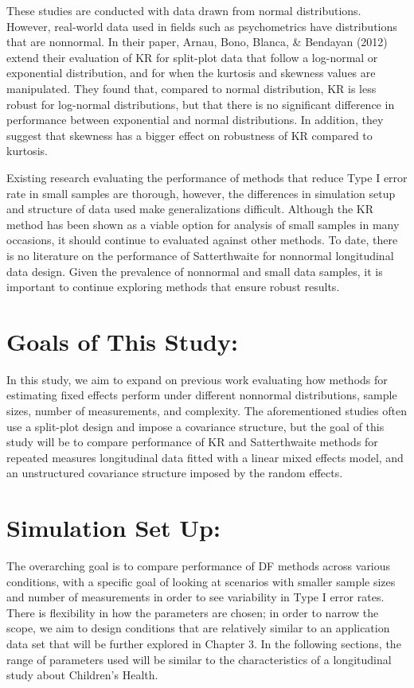 \documentclass[12pt, twoside]{amherstthesis}
\begin{document}
These studies are conducted with data drawn from normal distributions. However, real-world data used in fields such as psychometrics have distributions that are nonnormal. In their paper, Arnau, Bono, Blanca, \& Bendayan (2012) extend their evaluation of KR for split-plot data that follow a log-normal or exponential distribution, and for when the kurtosis and skewness values are manipulated. They found that, compared to normal distribution, KR is less robust for log-normal distributions, but that there is no significant difference in performance between exponential and normal distributions. In addition, they suggest that skewness has a bigger effect on robustness of KR compared to kurtosis.

Existing research evaluating the performance of methods that reduce Type I error rate in small samples are thorough, however, the differences in simulation setup and structure of data used make generalizations difficult. Although the KR method has been shown as a viable option for analysis of small samples in many occasions, it should continue to evaluated against other methods. To date, there is no literature on the performance of Satterthwaite for nonnormal longitudinal data design. Given the prevalence of nonnormal and small data samples, it is important to continue exploring methods that ensure robust results.

\hypertarget{goals-of-this-study}{%
\section{Goals of This Study:}\label{goals-of-this-study}}

In this study, we aim to expand on previous work evaluating how methods for estimating fixed effects perform under different nonnormal distributions, sample sizes, number of measurements, and complexity. The aforementioned studies often use a split-plot design and impose a covariance structure, but the goal of this study will be to compare performance of KR and Satterthwaite methods for repeated measures longitudinal data fitted with a linear mixed effects model, and an unstructured covariance structure imposed by the random effects.

\hypertarget{simulation-set-up}{%
\section{Simulation Set Up:}\label{simulation-set-up}}

The overarching goal is to compare performance of DF methods across various conditions, with a specific goal of looking at scenarios with smaller sample sizes and number of measurements in order to see variability in Type I error rates. There is flexibility in how the parameters are chosen; in order to narrow the scope, we aim to design conditions that are relatively similar to an application data set that will be further explored in Chapter 3. In the following sections, the range of parameters used will be similar to the characteristics of a longitudinal study about Children's Health.
\end{document}
